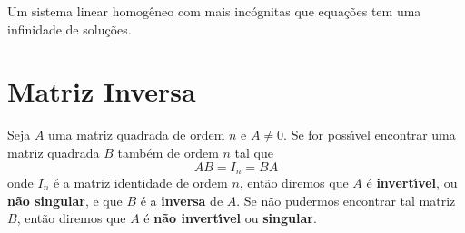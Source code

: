 \begin{teorema}
    Um sistema linear homog\^eneo com mais inc\'ognitas que equa\c{c}\~oes tem uma infinidade de solu\c{c}\~oes.
\end{teorema}

\section{Matriz Inversa}

\begin{definicao}
    Seja $A$ uma matriz quadrada de ordem $n$ e $A \ne 0$. Se for poss{\'\i}vel encontrar uma matriz quadrada $B$ tamb\'em de 
    ordem $n$ tal que
    \[
        AB = I_n = BA   
    \]
    onde $I_n$ \'e a matriz identidade de ordem $n$, ent\~ao diremos que $A$ \'e \textbf{invert{\'\i}vel}, ou \textbf{n\~ao singular}, e que $B$ \'e a \textbf{inversa} de $A$. Se n\~ao pudermos encontrar tal matriz $B$, ent\~ao diremos que $A$ \'e \textbf{n\~ao invert{\'\i}vel} ou \textbf{singular}.
\end{definicao}

